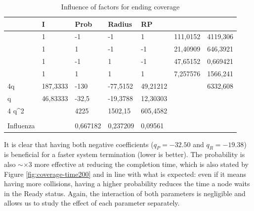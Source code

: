 \begin{table}[H]
\centering
\begin{tabular}{|l|l|l|l|l|l|l|}
\hline
                       & I        & Prob     & Radius   & RP       &          &          \\ \hline
                       & 1        & -1       & -1       & 1        & 111,0152 & 4119,306 \\ \hline
                       & 1        & 1        & -1       & -1       & 21,40909 & 646,3921 \\ \hline
                       & 1        & -1       & 1        & -1       & 47,65152 & 0,669421 \\ \hline
                       & 1        & 1        & 1        & 1        & 7,257576 & 1566,241 \\ \hline
4q                     & 187,3333 & -130     & -77,5152 & 49,21212 &          & 6332,608 \\ \hline
q                      & 46,83333 & -32,5    & -19,3788 & 12,30303 &          &          \\ \hline
4 q\textasciicircum{}2 &          & 4225     & 1502,15  & 605,4582 &          &          \\ \hline
                       &          &          &          &          &          &          \\ \hline
Influenza              &          & 0,667182 & 0,237209 & 0,09561  &          &          \\ \hline
\end{tabular}
\caption{Influence of factors for ending coverage}
\label{tab:influence-on-completion-time}
\end{table}

It is clear that having both negative coefficients ($q_P = -32.50$ and $q_R = -19.38$) is beneficial for a faster system termination (lower is better). The probability is also $\sim\times 3$ more effective at reducing the completion time, which is also stated by Figure \ref{fig:coverage-time200} and in line with what is expected: even if it means having more collisions, having a higher probability reduces the time a node waits in the Ready status. Again, the interaction of both parameters is negligible and allows us to study the effect of each parameter separately.